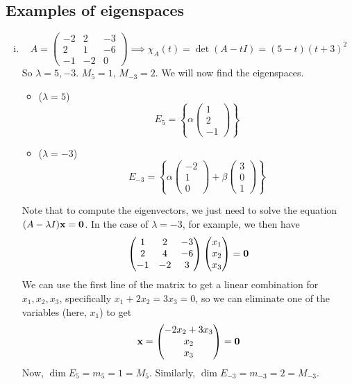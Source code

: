\subsection{Examples of eigenspaces}
\begin{enumerate}[(i)]
	\item
	      \[
		      A = \begin{pmatrix}
			      -2 & 2 & -3 \\ 2 & 1 & -6 \\ -1 & -2 & 0
		      \end{pmatrix} \implies \chi_A(t) = \det(A - tI) = (5-t)(t+3)^2
	      \]
	      So \(\lambda = 5, -3\).
	      \(M_5 = 1\), \(M_{-3} = 2\).
	      We will now find the eigenspaces.
	      \begin{itemize}
		      \item (\(\lambda = 5\))
		            \[
			            E_5 = \left\{ \alpha\begin{pmatrix}
				            1 \\ 2 \\ -1
			            \end{pmatrix} \right\}
		            \]
		      \item (\(\lambda = -3\))
		            \[
			            E_{-3} = \left\{ \alpha\begin{pmatrix}
				            -2 \\ 1 \\ 0
			            \end{pmatrix} + \beta\begin{pmatrix}
				            3 \\ 0 \\ 1
			            \end{pmatrix} \right\}
		            \]
	      \end{itemize}
	      Note that to compute the eigenvectors, we just need to solve the equation \((A - \lambda I)\vb x = \vb 0\).
	      In the case of \(\lambda = -3\), for example, we then have
	      \[
		      \begin{pmatrix}
			      1 & 2 & -3 \\ 2 & 4 & -6 \\ -1 & -2 & 3
		      \end{pmatrix} \begin{pmatrix}
			      x_1 \\ x_2 \\ x_3
		      \end{pmatrix} = \vb 0
	      \]
	      We can use the first line of the matrix to get a linear combination for \(x_1, x_2, x_3\), specifically \(x_1 + 2x_2 = 3x_3 = 0\), so we can eliminate one of the variables (here, \(x_1\)) to get
	      \[
		      \vb x = \begin{pmatrix}
			      -2x_2 + 3x_3 \\ x_2 \\ x_3
		      \end{pmatrix} = \vb 0
	      \]
	      Now, \(\dim E_5 = m_5 = 1 = M_5\).
	      Similarly, \(\dim E_{-3} = m_{-3} = 2 = M_{-3}\).


\end{enumerate}
